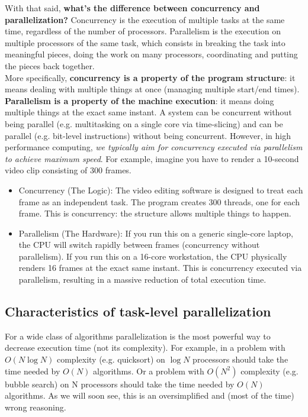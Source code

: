 With that said, \textbf{what's the difference between concurrency and parallelization?} Concurrency is the execution of multiple tasks at the same time, regardless of the number of processors. Parallelism is the execution on multiple processors of the same task, which consists in breaking the task into meaningful pieces, doing the work on many processors, coordinating and putting the pieces back together.\\
More specifically, \textbf{concurrency is a property of the program structure}: it means dealing with multiple things at once (managing multiple start/end times). \textbf{Parallelism is a property of the machine execution}: it means doing multiple things at the exact same instant. A system can be concurrent without being parallel (e.g. multitasking on a single core via time-slicing) and can be parallel (e.g. bit-level instructions) without being concurrent. However, in high performance computing,\textit{ we typically aim for concurrency executed via parallelism to achieve maximum speed}. For example, imagine you have to render a 10-second video clip consisting of 300 frames.
\begin{itemize}
    \item[-] Concurrency (The Logic): The video editing software is designed to treat each frame as an independent task. The program creates 300 threads, one for each frame. This is concurrency: the structure allows multiple things to happen.
    \item[-] Parallelism (The Hardware): If you run this on a generic single-core laptop, the CPU will switch rapidly between frames (concurrency without parallelism). If you run this on a 16-core workstation, the CPU physically renders 16 frames at the exact same instant. This is concurrency executed via parallelism, resulting in a massive reduction of total execution time.
\end{itemize}

\subsection{Characteristics of task-level parallelization}
For a wide class of algorithms parallelization is the most powerful way to decrease execution time (not its complexity). For example, in a problem with $O(N\log N)$ complexity (e.g. quicksort) on $\log N$ processors should take the time needed by $O(N)$ algorithms. Or a problem with $O(N^2)$ complexity (e.g. bubble search) on N processors should take the time needed by $O(N)$ algorithms. As we will soon see, this is an oversimplified and (most of the time) wrong reasoning.

